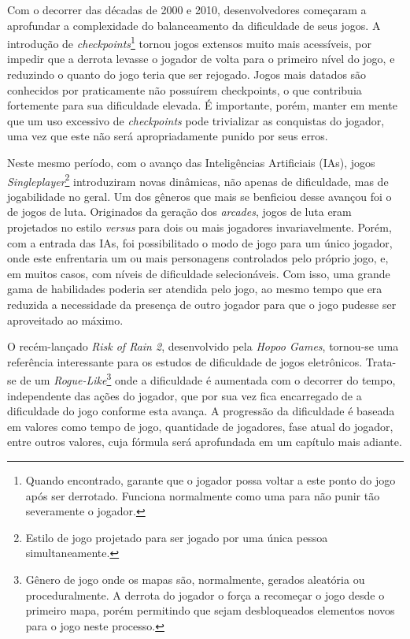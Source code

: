 Com o decorrer das décadas de 2000 e 2010, desenvolvedores começaram a aprofundar a complexidade do balanceamento da dificuldade de seus jogos. A introdução de \textit{checkpoints}\footnote{
    Quando encontrado, garante que o jogador possa voltar a este ponto do jogo após ser derrotado. Funciona normalmente como uma \textquotedbl{} para não punir tão severamente o jogador.
} tornou jogos extensos muito mais acessíveis, por impedir que a derrota levasse o jogador de volta para o primeiro nível do jogo, e reduzindo o quanto do jogo teria que ser rejogado. Jogos mais datados são conhecidos por praticamente não possuírem checkpoints, o que contribuia fortemente para sua dificuldade elevada. É importante, porém, manter em mente que um uso excessivo de \textit{checkpoints} pode trivializar as conquistas do jogador, uma vez que este não será apropriadamente punido por seus erros.

Neste mesmo período, com o avanço das Inteligências Artificiais (IAs), jogos \textit{Singleplayer}\footnote{
    Estilo de jogo projetado para ser jogado por uma única pessoa simultaneamente.
} introduziram novas dinâmicas, não apenas de dificuldade, mas de jogabilidade no geral. Um dos gêneros que mais se benficiou desse avançou foi o de jogos de luta. Originados da geração dos \textit{arcades}, jogos de luta eram projetados no estilo \textit{versus} para dois ou mais jogadores invariavelmente. Porém, com a entrada das IAs, foi possibilitado o modo de jogo para um único jogador, onde este enfrentaria um ou mais personagens controlados pelo próprio jogo, e, em muitos casos, com níveis de dificuldade selecionáveis. Com isso, uma grande gama de habilidades poderia ser atendida pelo jogo, ao mesmo tempo que era reduzida a necessidade da presença de outro jogador para que o jogo pudesse ser aproveitado ao máximo.

O recém-lançado \textit{Risk of Rain 2}, desenvolvido pela \textit{Hopoo Games}, tornou-se uma referência interessante para os estudos de dificuldade de jogos eletrônicos. Trata-se de um \textit{Rogue-Like}\footnote{
    Gênero de jogo onde os mapas são, normalmente, gerados aleatória ou proceduralmente. A derrota do jogador o força a recomeçar o jogo desde o primeiro mapa, porém permitindo que sejam desbloqueados elementos novos para o jogo neste processo.
} onde a dificuldade é aumentada com o decorrer do tempo, independente das ações do jogador, que por sua vez fica encarregado de \textquotedbl{} a dificuldade do jogo conforme esta avança. A progressão da dificuldade é baseada em valores como tempo de jogo, quantidade de jogadores, fase atual do jogador, entre outros valores, cuja fórmula será aprofundada em um capítulo mais adiante.

